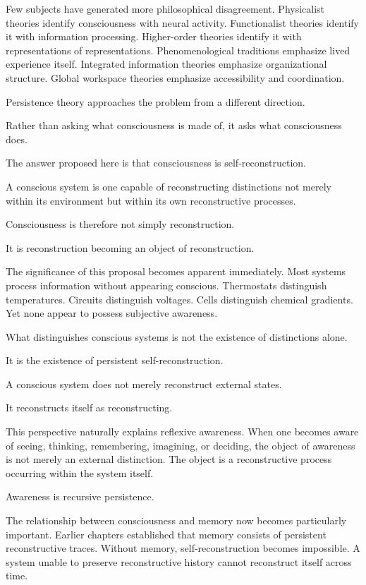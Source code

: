 \documentclass[12pt,oneside]{article}
\theoremstyle{definition}
\begin{document}
Few subjects have generated more philosophical disagreement. Physicalist theories identify consciousness with neural activity. Functionalist theories identify it with information processing. Higher-order theories identify it with representations of representations. Phenomenological traditions emphasize lived experience itself. Integrated information theories emphasize organizational structure. Global workspace theories emphasize accessibility and coordination.

Persistence theory approaches the problem from a different direction.

Rather than asking what consciousness is made of, it asks what consciousness does.

The answer proposed here is that consciousness is self-reconstruction.

A conscious system is one capable of reconstructing distinctions not merely within its environment but within its own reconstructive processes.

Consciousness is therefore not simply reconstruction.

It is reconstruction becoming an object of reconstruction.

The significance of this proposal becomes apparent immediately. Most systems process information without appearing conscious. Thermostats distinguish temperatures. Circuits distinguish voltages. Cells distinguish chemical gradients. Yet none appear to possess subjective awareness.

What distinguishes conscious systems is not the existence of distinctions alone.

It is the existence of persistent self-reconstruction.

A conscious system does not merely reconstruct external states.

It reconstructs itself as reconstructing.

This perspective naturally explains reflexive awareness. When one becomes aware of seeing, thinking, remembering, imagining, or deciding, the object of awareness is not merely an external distinction. The object is a reconstructive process occurring within the system itself.

Awareness is recursive persistence.

The relationship between consciousness and memory now becomes particularly important. Earlier chapters established that memory consists of persistent reconstructive traces. Without memory, self-reconstruction becomes impossible. A system unable to preserve reconstructive history cannot reconstruct itself across time.
\end{document}
